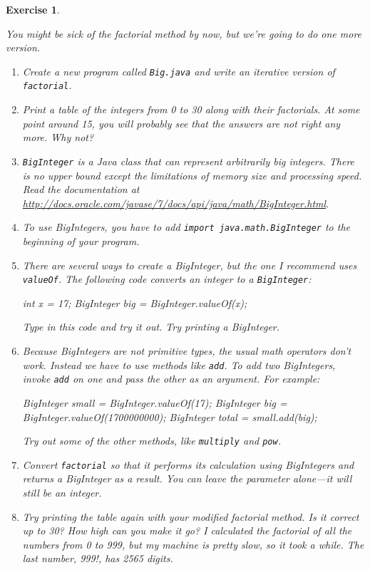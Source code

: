 \documentclass[12pt]{book}
\theoremstyle{exercise}
\newtheorem{exercise}{Exercise}[chapter]
\newcommand{\java}[1]{\verb"#1"}
\newcommand{\java}[1]{\lstinline{#1}} %
\begin{document}
\begin{exercise}
\label{ex.biginteger}

You might be sick of the factorial method by now, but we're going to do one more version.

\begin{enumerate}

\item Create a new program called \java{Big.java} and write an iterative version of \java{factorial}.

\item Print a table of the integers from 0 to 30 along with their factorials.
At some point around 15, you will probably see that the answers are not right any more.
Why not?

\item \java{BigInteger} is a Java class that can represent arbitrarily big integers.
There is no upper bound except the limitations of memory size and processing speed.
Read the documentation at \url{http://docs.oracle.com/javase/7/docs/api/java/math/BigInteger.html}.

\item To use BigIntegers, you have to add \java{import java.math.BigInteger} to the beginning of your program.

\item There are several ways to create a BigInteger, but the one I recommend uses \java{valueOf}.
The following code converts an integer to a \java{BigInteger}:

\begin{code}
    int x = 17;
    BigInteger big = BigInteger.valueOf(x);
\end{code}

Type in this code and try it out.
Try printing a BigInteger.

\item Because BigIntegers are not primitive types, the usual math operators don't work.
Instead we have to use methods like \java{add}.
To add two BigIntegers, invoke \java{add} on one and pass the other as an argument.
For example:

\begin{code}
    BigInteger small = BigInteger.valueOf(17);
    BigInteger big = BigInteger.valueOf(1700000000);
    BigInteger total = small.add(big);
\end{code}

Try out some of the other methods, like \java{multiply} and \java{pow}.

\item Convert \java{factorial} so that it performs its calculation using BigIntegers and returns a BigInteger as a result.
You can leave the parameter alone---it will still be an integer.

\item Try printing the table again with your modified factorial method.
Is it correct up to 30?
How high can you make it go?
I calculated the factorial of all the numbers from 0 to 999, but my machine is pretty slow, so it took a while.
The last number, 999!, has 2565 digits.

\end{enumerate}
\end{exercise}
\end{document}
